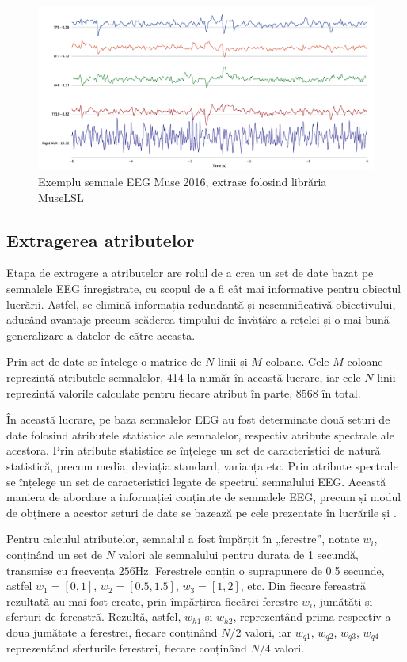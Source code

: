 \begin{figure}[ht]
\centering
\includegraphics[width=\textwidth, keepaspectratio]{fig/cap3/museEEGplot.png}
\caption{Exemplu semnale EEG Muse 2016, extrase folosind librăria MuseLSL}
\label{fig:muse_eeg_sample}
\end{figure}

\subsection{Extragerea atributelor} 
Etapa de extragere a atributelor are rolul de a crea un set de date bazat pe semnalele EEG înregistrate, cu scopul de a fi cât mai informative pentru obiectul lucrării. Astfel, se elimină informația redundantă și nesemnificativă obiectivului, aducând avantaje precum scăderea timpului de învățăre a rețelei și o mai bună generalizare a datelor de către aceasta.

Prin set de date se înțelege o matrice de $N$ linii și $M$ coloane. Cele $M$ coloane reprezintă atributele semnalelor, 414 la număr în această lucrare, iar cele $N$ linii reprezintă valorile calculate pentru fiecare atribut în parte, 8568 în total.

În această lucrare, pe baza semnalelor EEG au fost determinate două seturi de date folosind atributele statistice ale semnalelor, respectiv atribute spectrale ale acestora. Prin atribute statistice se înțelege un set de caracteristici de natură statistică, precum media, deviația standard, varianța etc. Prin atribute spectrale se înțelege un set de caracteristici legate de spectrul semnalului EEG. Această maniera de abordare a informației conținute de semnalele EEG, precum și modul de obținere a acestor seturi de date se bazează pe cele prezentate în lucrările \cite{eeg-cnn:2020} și \cite{eeg:2018}.

Pentru calculul atributelor, semnalul a fost împărțit în „ferestre”, notate $w_i$, conținând un set de $N$ valori ale semnalului pentru durata de 1 secundă, transmise cu frecvența $256\si{\hertz}$. Ferestrele conțin o suprapunere de 0.5 secunde, astfel $w_1=[0,1]$, $w_2=[0.5,1.5]$, $w_3=[1,2]$, etc. Din fiecare fereastră rezultată au mai fost create, prin împărțirea fiecărei ferestre $w_i$, jumătăți și sferturi de fereastră. Rezultă, astfel, $w_{h1}$ și $w_{h2}$, reprezentând prima respectiv a doua jumătate a ferestrei, fiecare conținând $N/2$ valori, iar $w_{q1}$, $w_{q2}$, $w_{q3}$, $w_{q4}$ reprezentând sferturile ferestrei, fiecare conținând $N/4$ valori.

